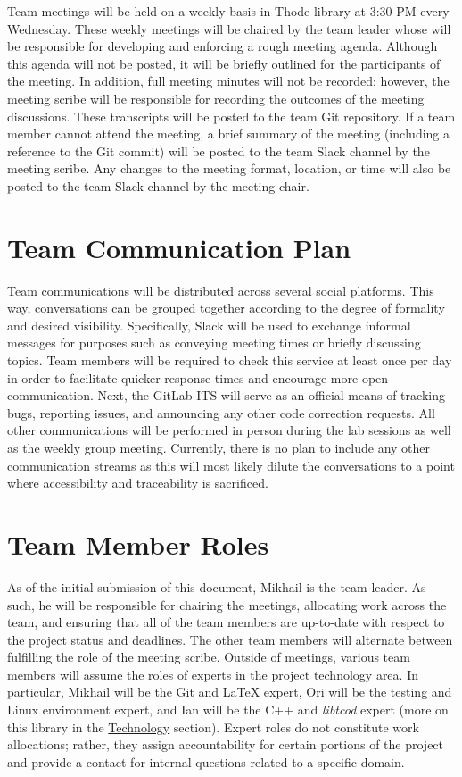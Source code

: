 \documentclass{article}
\begin{document}
\indent
Team meetings will be held on a weekly basis in Thode library at 3:30 PM every Wednesday.  These weekly meetings will be chaired by the team leader whose will be responsible for developing and enforcing a rough meeting agenda.  Although this agenda will not be posted, it will be briefly outlined for the participants of the meeting.  In addition, full meeting minutes will not be recorded; however, the meeting scribe will be responsible for recording the outcomes of the meeting discussions.  These transcripts will be posted to the team Git repository.  If a team member cannot attend the meeting, a brief summary of the meeting (including a reference to the Git commit) will be posted to the team Slack channel by the meeting scribe.  Any changes to the meeting format, location, or time will also be posted to the team Slack channel by the meeting chair.

\section{Team Communication Plan}
\label{communication_label}

\indent
Team communications will be distributed across several social platforms.  This way, conversations can be grouped together according to the degree of formality and desired visibility.  Specifically, Slack will be used to exchange informal messages for purposes such as conveying meeting times or briefly discussing topics.  Team members will be required to check this service at least once per day in order to facilitate quicker response times and encourage more open communication.  Next, the GitLab ITS will serve as an official means of tracking bugs, reporting issues, and announcing any other code correction requests.  All other communications will be performed in person during the lab sessions as well as the weekly group meeting.  Currently, there is no plan to include any other communication streams as this will most likely dilute the conversations to a point where accessibility and traceability is sacrificed.

\section{Team Member Roles}
\label{roles_label}

\indent
As of the initial submission of this document, Mikhail is the team leader.  As such, he will be responsible for chairing the meetings, allocating work across the team, and ensuring that all of the team members are up-to-date with respect to the project status and deadlines.  The other team members will alternate between fulfilling the role of the meeting scribe. Outside of meetings, various team members will assume the roles of experts in the project technology area.  In particular, Mikhail will be the Git and LaTeX expert, Ori will be the testing and Linux environment expert, and Ian will be the C++ and \textit{libtcod} expert (more on this library in the \hyperref[tech_label]{Technology} section).  Expert roles do not constitute work allocations; rather, they assign accountability for certain portions of the project and provide a contact for internal questions related to a specific domain.
\end{document}
